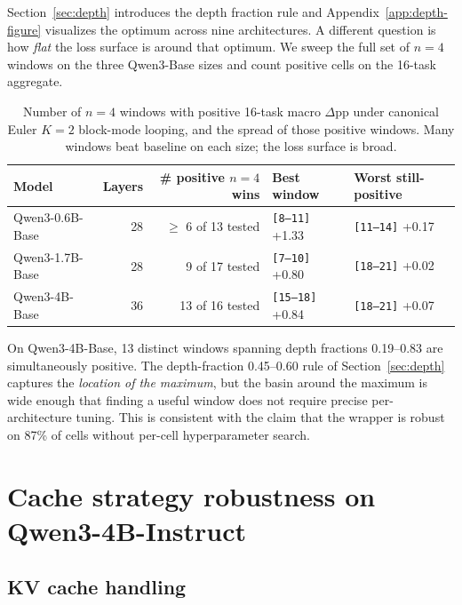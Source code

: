 Section~\ref{sec:depth} introduces the depth fraction rule and Appendix~\ref{app:depth-figure} visualizes the optimum across nine architectures. A different question is how \emph{flat} the loss surface is around that optimum. We sweep the full set of $n{=}4$ windows on the three Qwen3-Base sizes and count positive cells on the 16-task aggregate.

\begin{table}[h]
\centering
\footnotesize
\caption{Number of $n{=}4$ windows with positive 16-task macro $\Delta$pp under canonical Euler $K{=}2$ block-mode looping, and the spread of those positive windows. Many windows beat baseline on each size; the loss surface is broad.}
\label{tab:position-landscape}
\setlength{\tabcolsep}{6pt}
\begin{tabular}{lrrll}
\toprule
Model & Layers & \# positive $n{=}4$ wins & Best window & Worst still-positive \\
\midrule
Qwen3-0.6B-Base & 28 & $\geq$ 6 of 13 tested
                & \texttt{[8--11]} +1.33
                & \texttt{[11--14]} +0.17 \\
Qwen3-1.7B-Base & 28 & 9 of 17 tested
                & \texttt{[7--10]} +0.80
                & \texttt{[18--21]} +0.02 \\
Qwen3-4B-Base   & 36 & 13 of 16 tested
                & \texttt{[15--18]} +0.84
                & \texttt{[18--21]} +0.07 \\
\bottomrule
\end{tabular}
\end{table}

On Qwen3-4B-Base, 13 distinct windows spanning depth fractions 0.19--0.83 are simultaneously positive. The depth-fraction 0.45--0.60 rule of Section~\ref{sec:depth} captures the \emph{location of the maximum}, but the basin around the maximum is wide enough that finding a useful window does not require precise per-architecture tuning. This is consistent with the claim that the wrapper is robust on 87\% of cells without per-cell
hyperparameter search.

\section{Cache strategy robustness on Qwen3-4B-Instruct}
\label{app:cache-robustness}
\subsection{KV cache handling}
\label{sec:cache}


